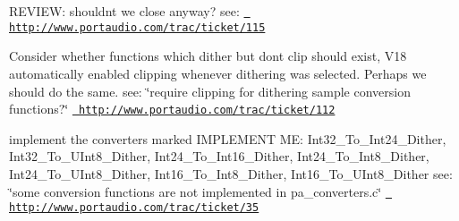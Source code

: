 
\begin{DoxyRefList}
\item[Member \mbox{\hyperlink{pa__front_8c_a92f56f88cbd14da0e8e03077e835d104}{Pa\+\_\+\+Close\+Stream}} (Pa\+Stream $\ast$stream)]\label{todo__todo000010}%
%
REVIEW\+: shouldn\textquotesingle{}t we close anyway? see\+: \href{http://www.portaudio.com/trac/ticket/115}{\texttt{ http\+://www.\+portaudio.\+com/trac/ticket/115}}  
\item[File \mbox{\hyperlink{pa__converters_8c}{pa\+\_\+converters.c}} ]\label{todo__todo000002}%
%
Consider whether functions which dither but don\textquotesingle{}t clip should exist, V18 automatically enabled clipping whenever dithering was selected. Perhaps we should do the same. see\+: \char`\"{}require clipping for dithering sample conversion functions?\char`\"{} \href{http://www.portaudio.com/trac/ticket/112}{\texttt{ http\+://www.\+portaudio.\+com/trac/ticket/112}}

\label{todo__todo000003}%
%
implement the converters marked IMPLEMENT ME\+: Int32\+\_\+\+To\+\_\+\+Int24\+\_\+\+Dither, Int32\+\_\+\+To\+\_\+\+UInt8\+\_\+\+Dither, Int24\+\_\+\+To\+\_\+\+Int16\+\_\+\+Dither, Int24\+\_\+\+To\+\_\+\+Int8\+\_\+\+Dither, Int24\+\_\+\+To\+\_\+\+UInt8\+\_\+\+Dither, Int16\+\_\+\+To\+\_\+\+Int8\+\_\+\+Dither, Int16\+\_\+\+To\+\_\+\+UInt8\+\_\+\+Dither see\+: \char`\"{}some conversion functions are not implemented in pa\+\_\+converters.\+c\char`\"{} \href{http://www.portaudio.com/trac/ticket/35}{\texttt{ http\+://www.\+portaudio.\+com/trac/ticket/35}}


\end{DoxyRefList}
